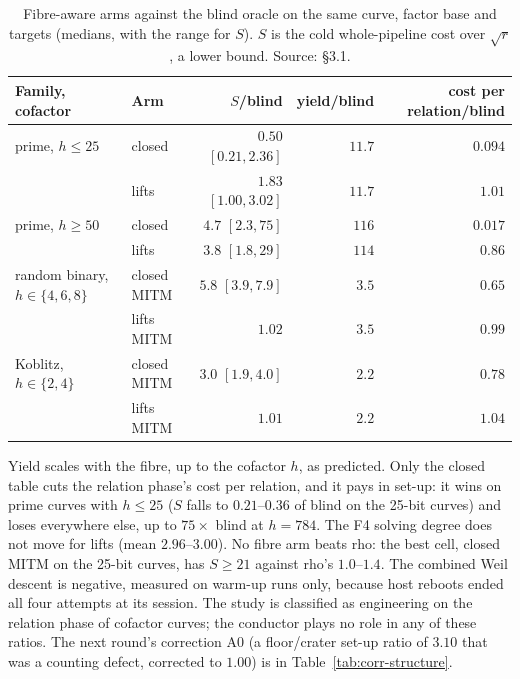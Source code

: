 \begin{table}[t]
\centering\small
\begin{tabular}{@{}llrrr@{}}
\toprule
Family, cofactor & Arm & $S$/blind & yield/blind & cost per relation/blind \\
\midrule
prime, $h\le25$ & closed & $0.50$ $[0.21,2.36]$ & $11.7$ & $0.094$ \\
 & lifts & $1.83$ $[1.00,3.02]$ & $11.7$ & $1.01$ \\
prime, $h\ge50$ & closed & $4.7$ $[2.3,75]$ & $116$ & $0.017$ \\
 & lifts & $3.8$ $[1.8,29]$ & $114$ & $0.86$ \\
\addlinespace
random binary, $h\in\{4,6,8\}$ & closed MITM & $5.8$ $[3.9,7.9]$ & $3.5$ & $0.65$ \\
 & lifts MITM & $1.02$ & $3.5$ & $0.99$ \\
Koblitz, $h\in\{2,4\}$ & closed MITM & $3.0$ $[1.9,4.0]$ & $2.2$ & $0.78$ \\
 & lifts MITM & $1.01$ & $2.2$ & $1.04$ \\
\bottomrule
\end{tabular}
\caption[]{Fibre-aware arms against the blind oracle on the same curve,
factor base and targets (medians, with the range for $S$). $S$ is the cold
whole-pipeline cost over $\sqrt r$, a lower bound. Source:
 \S3.1.}
\label{tab:iso-fibre}
\end{table}

Yield scales with the fibre, up to the cofactor $h$, as predicted. Only the
closed table cuts the relation phase's cost per relation, and it pays in
set-up: it wins on prime curves with $h\le25$ ($S$ falls to $0.21$--$0.36$
of blind on the 25-bit curves) and loses everywhere else, up to $75\times$
blind at $h=784$. The F4 solving degree does not move for lifts (mean
$2.96$--$3.00$). No fibre arm beats rho: the best cell, closed MITM on the
25-bit curves, has $S\ge21$ against rho's $1.0$--$1.4$. The combined Weil
descent is negative, measured on warm-up runs only, because host reboots
ended all four attempts at its session. The study is classified as
engineering on the relation phase of cofactor curves; the conductor plays
no role in any of these ratios. The next round's correction A0 (a
floor/crater set-up ratio of $3.10$ that was a counting defect, corrected to
$1.00$) is in Table~\ref{tab:corr-structure}.

